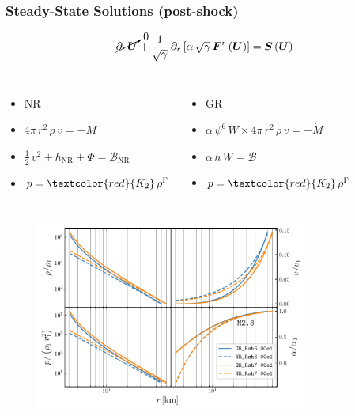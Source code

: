 \documentclass{beamer}
\newcommand{\red}{\textcolor{red}}
\newcommand{\p}{\partial}
\newcommand{\bs}{\boldsymbol}
\newcommand{\nr}{\mathrm{NR}}
\newcommand{\mdot}{\dot{M}}
\begin{document}
\begin{frame}
\frametitle{Steady-State Solutions (post-shock)}

  \begin{equation*}
    \cancelto{0}{\p_{t}\,\bs{U}}
    +\frac{1}{\sqrt{\gamma}}\,
    \p_{r}\left[\alpha\,\sqrt{\gamma}\,\bs{F}^{r}\left(\bs{U}\right)\right]
    =\bs{S}\left(\bs{U}\right)
  \end{equation*}

  \begin{columns}[c]


      \begin{itemize}
        \item[]
          NR
        \item[]
          $4\pi\,r^{2}\,\rho\,v=-\mdot$
        \item[]
          $\frac{1}{2}\,v^{2}+h_{\nr}+\Phi=\mathcal{B}_{\nr}$
        \item[]
          $p=\red{K_{2}}\,\rho^{\Gamma}$
      \end{itemize}


      \begin{itemize}
        \item[]
          GR
        \item[]
          $\alpha\,\psi^{6}\,W\times4\pi\,r^{2}\,\rho\,v=-\mdot$
        \item[]
          $\alpha\,h\,W=\mathcal{B}$
        \item[]
          $p=\red{K_{2}}\,\rho^{\Gamma}$
      \end{itemize}

  \end{columns}

\end{frame}

\begin{frame}

  \begin{figure}[htb!]
    \centering
    \includegraphics[width=0.8\textwidth]{fig.CompareNRvsGR_SS_M2.8.pdf}
  \end{figure}

\end{frame}
\end{document}
